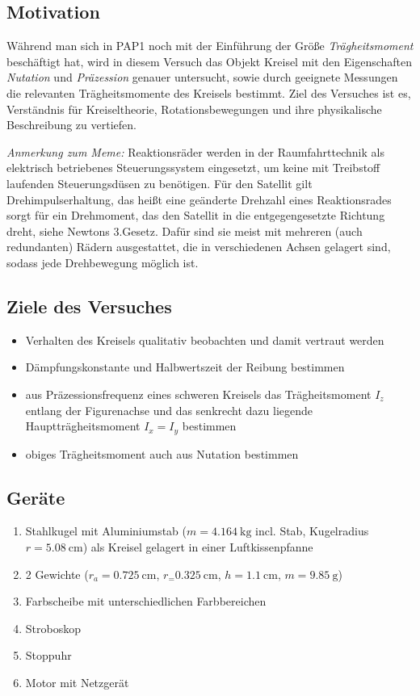 \subsection{Motivation}
Während man sich in PAP1 noch mit der Einführung der Größe \textit{Trägheitsmoment} beschäftigt hat, wird in diesem Versuch das Objekt Kreisel mit den Eigenschaften \textit{Nutation} und \textit{Präzession} genauer untersucht, sowie durch geeignete Messungen die relevanten Trägheitsmomente des Kreisels bestimmt. 
Ziel des Versuches ist es, Verständnis für Kreiseltheorie, Rotationsbewegungen und ihre physikalische Beschreibung zu vertiefen.

\textit{Anmerkung zum Meme:} Reaktionsräder werden in der Raumfahrttechnik als elektrisch betriebenes Steuerungssystem eingesetzt, um keine mit Treibstoff laufenden Steuerungsdüsen zu benötigen. Für den Satellit gilt Drehimpulserhaltung, das heißt eine geänderte Drehzahl eines Reaktionsrades sorgt für ein Drehmoment, das den Satellit in die entgegengesetzte Richtung dreht, siehe Newtons 3.Gesetz. Dafür sind sie meist mit mehreren (auch redundanten) Rädern ausgestattet, die in verschiedenen Achsen gelagert sind, sodass jede Drehbewegung möglich ist. 

\subsection{Ziele des Versuches}
\begin{itemize}
    \item Verhalten des Kreisels qualitativ beobachten und damit vertraut werden
    \item Dämpfungskonstante und Halbwertszeit der Reibung bestimmen
    \item aus Präzessionsfrequenz eines schweren Kreisels das Trägheitsmoment \(I_z\) entlang der Figurenachse und das senkrecht dazu liegende Hauptträgheitsmoment \(I_x = I_y\) bestimmen
    \item obiges Trägheitsmoment auch aus Nutation bestimmen
\end{itemize}

\subsection{Geräte}
\begin{enumerate}
    \item Stahlkugel mit Aluminiumstab (\(m = \qty{4.164}{\kilogram}\) incl. Stab, Kugelradius\(r=\qty{5,08}{\cm}\)) als Kreisel gelagert in einer Luftkissenpfanne
    \item 2 Gewichte (\(r_a=\qty{0.725}{\cm}\), \(r_=\qty{0.325}{\cm}\), \(h=\qty{1.1}{\cm}\), \(m=\qty{9.85}{\gram}\))
    \item Farbscheibe mit unterschiedlichen Farbbereichen
    \item Stroboskop
    \item Stoppuhr
    \item Motor mit Netzgerät
\end{enumerate}

